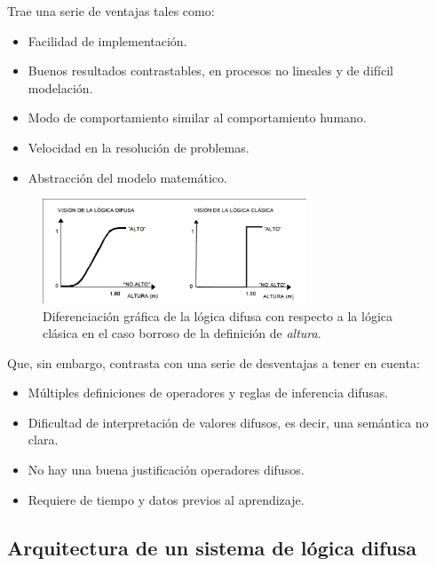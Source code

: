 \documentclass[a4paper, 11pt, titlepage]{article}
\begin{document}
    Trae una serie de ventajas tales como:

    \begin{itemize}
        \item Facilidad de implementación.
        \item Buenos resultados contrastables, en procesos no lineales y de difícil modelación.
        \item Modo de comportamiento similar al comportamiento humano.
        \item Velocidad en la resolución de problemas.
        \item Abstracción del modelo matemático.
    \end{itemize}

    \begin{figure}[htp]
        \centering
        \includegraphics[width=0.7\textwidth]{resources/logicadifusa2.jpg}
        \caption{Diferenciación gráfica de la lógica difusa con respecto a la lógica clásica en el 
        caso borroso de la definición de \textit{altura}.}
        \label{logicadifusa2}
    \end{figure}

    Que, sin embargo, contrasta con una serie de desventajas a tener en cuenta:

    \begin{itemize}
        \item Múltiples definiciones de operadores y reglas de inferencia difusas.
        \item Dificultad de interpretación de valores difusos, es decir, una semántica no clara.
        \item No hay una buena justificación operadores difusos.
        \item Requiere de tiempo y datos previos al aprendizaje.
    \end{itemize}

    \subsection{Arquitectura de un sistema de lógica difusa}
\end{document}
